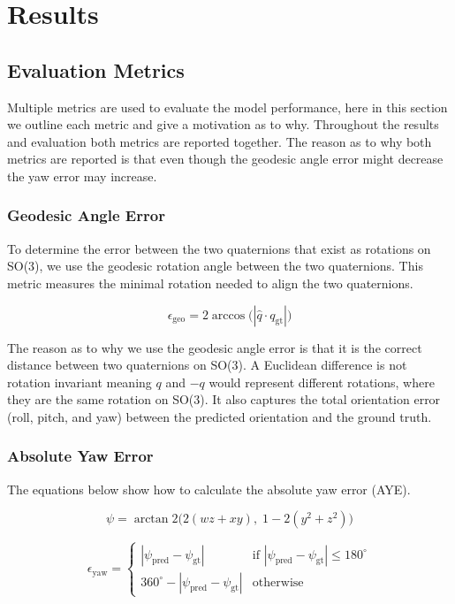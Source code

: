 \section{Results}

\subsection{Evaluation Metrics}
Multiple metrics are used to evaluate the model performance, here in this section we outline each metric and give a motivation as to why. Throughout the results and evaluation both metrics are
reported together. The reason as to why both metrics are reported is that even though the geodesic angle error might decrease the yaw error may increase.

\subsubsection{Geodesic Angle Error}
To determine the error between the two quaternions that exist as rotations on SO(3), we use the geodesic rotation angle between the two
quaternions. This metric measures the minimal rotation needed to align the two quaternions.

\begin{equation}
    \epsilon_{\text{geo}} = 2\arccos\!\bigl(|\hat{q} \cdot q_{\text{gt}}|\bigr)
\end{equation}

The reason as to why we use the geodesic angle error is that it is the correct distance between two quaternions on SO(3). A Euclidean difference is not rotation invariant meaning 
$q$ and $-q$ would represent different rotations, where they are the same rotation on SO(3). It also captures the total orientation error (roll, pitch, and yaw) between the predicted orientation
and the ground truth.

\subsubsection{Absolute Yaw Error}
The equations below show how to calculate the absolute yaw error (AYE).

\begin{equation}
    \psi = \arctan2\!\bigl(2(wz + xy),\; 1 - 2(y^2 + z^2)\bigr)
\end{equation}

\begin{equation}
    \epsilon_{\text{yaw}} =
    \begin{cases}
        |\psi_{\text{pred}} - \psi_{\text{gt}}| & \text{if } |\psi_{\text{pred}} - \psi_{\text{gt}}| \leq 180^{\circ} \\
        360^{\circ} - |\psi_{\text{pred}} - \psi_{\text{gt}}| & \text{otherwise}
    \end{cases}
\end{equation}


